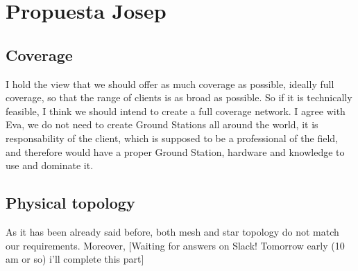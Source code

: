 \section{Propuesta Josep}
\subsection{Coverage}
I hold the view that we should offer as much coverage as possible, ideally full coverage, so that the range of clients is as broad as possible. So if it is technically feasible, I think we should intend to create a full coverage network. I agree with Eva, we do not need to create Ground Stations all around the world, it is responsability of the client, which is supposed to be a professional of the field, and therefore would have a proper Ground Station, hardware and knowledge to use and dominate it.
\subsection{Physical topology}
As it has been already said before, both mesh and star topology do not match our requirements. Moreover, [Waiting for answers on Slack! Tomorrow early (10 am or so) i'll complete this part]


